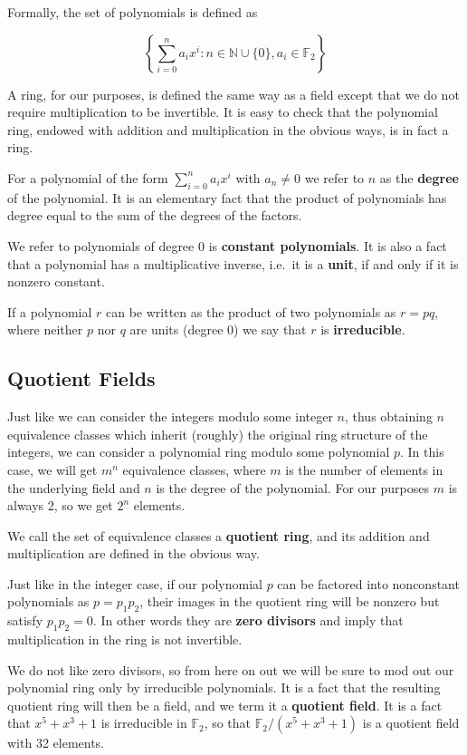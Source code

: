\documentclass[letterpaper]{article}
\newcommand{\ftwo}{\mathbb{F}_2}
\begin{document}
Formally, the set of polynomials is defined as

\[ \left\{ \sum_{i=0}^n a_{i}x^i : n\in\mathbb{N}\cup\{0\}, a_i\in \ftwo  \right\} \]

A ring, for our purposes, is defined the same way as a field except that we do
not require multiplication to be invertible. It is easy to check that the
polynomial ring, endowed with addition and multiplication in the obvious ways,
is in fact a ring.

For a polynomial of the form $\sum_{i=0}^n a_{i}x^i$ with $a_n\neq0$ we refer to $n$ as the
\textbf{degree} of the polynomial. It is an elementary fact that the product
of polynomials has degree equal to the sum of the degrees of the factors.

We refer to polynomials of degree 0 is \textbf{constant polynomials}. It is
also a fact that a polynomial has a multiplicative inverse, i.e.~it is a
\textbf{unit}, if and only if it is nonzero constant.

If a polynomial $r$ can be written as the product of two polynomials as $r=pq$,
where neither $p$ nor $q$ are units (degree 0) we say that $r$ is
\textbf{irreducible}.

\subsection{Quotient Fields}

Just like we can consider the integers modulo some integer $n$, thus obtaining
$n$ equivalence classes which inherit (roughly) the original ring structure of
the integers, we can consider a polynomial ring modulo some polynomial $p$. In
this case, we will get $m^n$ equivalence classes, where $m$ is the number of
elements in the underlying field and $n$ is the degree of the polynomial. For
our purposes $m$ is always 2, so we get $2^n$ elements.

We call the set of equivalence classes a \textbf{quotient ring}, and its addition
and multiplication are defined in the obvious way.

Just like in the integer case, if our polynomial $p$ can be factored into
nonconstant polynomials as $p=p_1p_2$, their images in the quotient ring will
be nonzero but satisfy $p_1p_2 = 0$. In other words they are \textbf{zero
divisors} and imply that multiplication in the ring is not invertible.

We do not like zero divisors, so from here on out we will be sure to mod out
our polynomial ring only by irreducible polynomials. It is a fact that the
resulting quotient ring will then be a field, and we term it a \textbf{quotient
field}. It is a fact that $x^5 + x^3 + 1$ is irreducible in $\ftwo$, so that
$\ftwo/(x^5 + x^3 + 1)$ is a quotient field with 32 elements.
\end{document}

